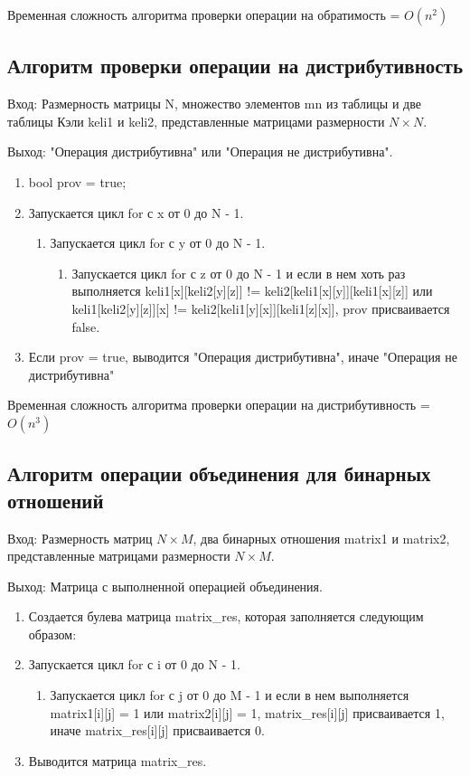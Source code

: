 \documentclass[bachelor, och, labwork]{shiza}
\begin{document}
	Временная сложность алгоритма проверки операции на обратимость = $O(n^2)$	
	
	\subsection{Алгоритм проверки операции на дистрибутивность}	
	
	$\textit{Вход:}$ Размерность матрицы N, множество элементов mn из таблицы и две таблицы Кэли keli1 и keli2, представленные матрицами размерности $N \times N$.

	$\textit{Выход:}$  "Операция дистрибутивна" или "Операция не дистрибутивна".		
	
	\begin{enumerate} 
		\item bool prov = true;
		\item Запускается цикл for с x от 0 до N - 1.
		\begin{enumerate} 
			\item Запускается цикл for с y от 0 до N - 1.
			\begin{enumerate} 
				\item Запускается цикл for с z от 0 до N - 1 и если в нем хоть раз выполняется keli1[x][keli2[y][z]] !=
				keli2[keli1[x][y]][keli1[x][z]] или
				keli1[keli2[y][z]][x] !=
				keli2[keli1[y][x]][keli1[z][x]], prov присваивается false.
			\end{enumerate} 
		\end{enumerate}
		\item Если prov = true, выводится "Операция дистрибутивна", иначе "Операция не дистрибутивна"
	\end{enumerate} 
	
	Временная сложность алгоритма проверки операции на дистрибутивность = $O(n^3)$
	
	\subsection{Алгоритм операции объединения для бинарных отношений}	
	
		$\textit{Вход:}$ Размерность матриц $N \times M$, два бинарных отношения matrix1 и matrix2, представленные матрицами размерности $N \times M$.
	
		$\textit{Выход:}$  Матрица с выполненной операцией объединения.
	
	\begin{enumerate} 
		\item Создается булева матрица matrix\_res, которая заполняется следующим образом:
		\item Запускается цикл for с i от 0 до N - 1.
		\begin{enumerate} 
			\item Запускается цикл for с j от 0 до M - 1 и если в нем выполняется matrix1[i][j] = 1 или
			matrix2[i][j] = 1, matrix\_res[i][j] присваивается 1, иначе matrix\_res[i][j] присваивается 0.
		\end{enumerate}
		\item Выводится матрица matrix\_res.
	\end{enumerate} 
	
\end{document}
